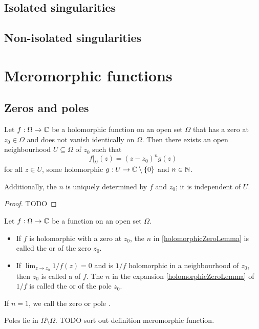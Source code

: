 \subsection{Isolated singularities}

\subsection{Non-isolated singularities}

\section{Meromorphic functions}
\subsection{Zeros and poles}
\begin{lemma} \label{holomorphicZeroLemma}
Let $f:\Omega\to \mathbb{C}$ be a holomorphic function on an open set $\Omega$ that has a zero at $z_0\in \Omega$ and does not vanish identically on $\Omega$. Then there exists an open neighbourhood $U\subseteq \Omega$ of $z_0$ such that
\[ f|_U(z) = (z-z_0)^ng(z) \]
for all $z\in U$, some holomorphic $g:U\to \mathbb{C}\setminus\{0\}$ and $n\in \mathbb{N}$.

Additionally, the $n$ is uniquely determined by $f$ and $z_0$; it is independent of $U$.
\end{lemma}
\begin{proof}
TODO
\end{proof}

\begin{definition}
Let $f:\Omega\to \mathbb{C}$ be a function on an open set $\Omega$.
\begin{itemize}
\item If $f$ is holomorphic with a zero at $z_0$, the $n$ in \ref{holomorphicZeroLemma} is called the  or  of the zero $z_0$.
\item If $\lim_{z\to z_0} 1/f(z) = 0$ and is $1/f$ holomorphic in a neighbourhood of $z_0$, then $z_0$ is called a  of $f$. The $n$ in the expansion \ref{holomorphicZeroLemma} of $1/f$ is called the  or  of the pole $z_0$.
\end{itemize}
If $n = 1$, we call the zero or pole . 
\end{definition}

Poles lie in $\overline{\Omega}\setminus\Omega$. TODO sort out definition meromorphic function.

